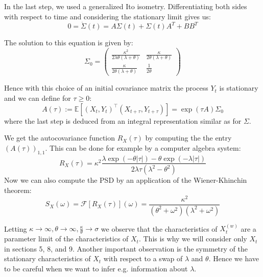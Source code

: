 \documentclass[%
thesis=student,%
coverpage=false,%
titlepage=false,%
headmarks=true, %
english,%
font=libertine, %
math=newpxtx, %
BCOR=5mm,%
coverBCOR=11mm%
]{tumbook}
\begin{document}
In the last step, we used a generalized Ito isometry. Differentiating both sides with respect to time and considering the stationary limit gives us:
\[
0 = \dot{\Sigma}(t) = A\Sigma(t) + \Sigma(t) A^{T} + BB^{T} 
\]

The solution to this equation is given by: 
\[
\Sigma_{0} = 
\begin{pmatrix}
    \frac{\kappa^{2}}{2\lambda\theta(\lambda + \theta)} & \frac{\kappa}{2\theta(\lambda + \theta)} \\
    \frac{\kappa}{2\theta(\lambda + \theta)} & \frac{1}{2\theta}
\end{pmatrix}
\]

Hence with this choice of an initial covariance matrix the process $Y_{t}$ is stationary and we can define for $\tau \geq 0$:
\[
A(\tau):=\mathbb{E}[(X_{t},Y_{t})^\top(X_{t+\tau},Y_{t+\tau})] = \exp(\tau A)\Sigma_{0}
\]
where the last step is deduced from an integral representation similar as for $\Sigma$.

We get the autocovariance function $R_{X}(\tau)$ by computing the the entry $(A(\tau))_{1,1}$. This can be done for example by a computer algebra system: 
\[
R_{X}(\tau) = \kappa^{2}\frac{\lambda\exp(-\theta\lvert\tau\rvert)-\theta\exp(-\lambda\lvert\tau\rvert)}{2\lambda\tau(\lambda^{2}-\theta^{2})} 
\]
Now we can also compute the PSD by an application of the Wiener-Khinchin theorem:
\[
S_{X}(\omega) = \mathcal{F}[R_{X}(\tau)](\omega) = \frac{\kappa^{2}}{(\theta^{2} + \omega^{2})(\lambda^{2} + \omega^{2})}
\]

Letting $\kappa \rightarrow \infty, \theta \rightarrow \infty, \frac{\kappa}{\theta} \rightarrow \sigma$ we observe that the characteristics of $X_{t}^{(w)}$ are a parameter limit of the characteristics of $X_{t}$. This is why we will consider only $X_{t}$ in sections 5, 8, and 9.
Another important observation is the symmetry of the stationary characteristics of $X_{t}$ with respect to a swap of $\lambda$ and $\theta$. Hence we have to be careful when we want to infer e.g. information about $\lambda$.
\end{document}
